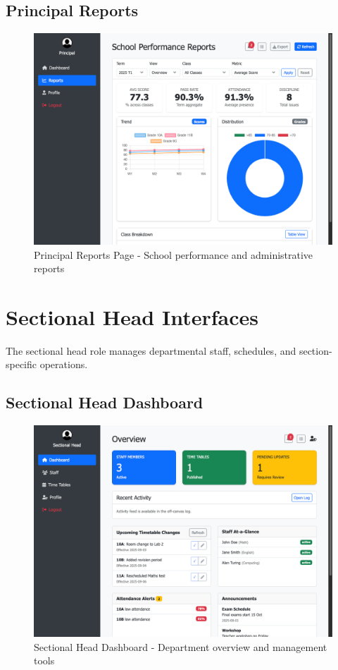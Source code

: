 \documentclass[12pt,a4paper]{article}
\begin{document}
\subsection{Principal Reports}
\begin{figure}[H]
    \centering
    \includegraphics[width=\textwidth]{principal/principal-reports-page.png}
    \caption{Principal Reports Page - School performance and administrative reports}
    \label{fig:principal-reports}
\end{figure}

\section{Sectional Head Interfaces}

The sectional head role manages departmental staff, schedules, and section-specific operations.

\subsection{Sectional Head Dashboard}
\begin{figure}[H]
    \centering
    \includegraphics[width=\textwidth]{sectional-head/sectionalhead-dashboard-page.png}
    \caption{Sectional Head Dashboard - Department overview and management tools}
    \label{fig:sectionalhead-dashboard}
\end{figure}
\end{document}
